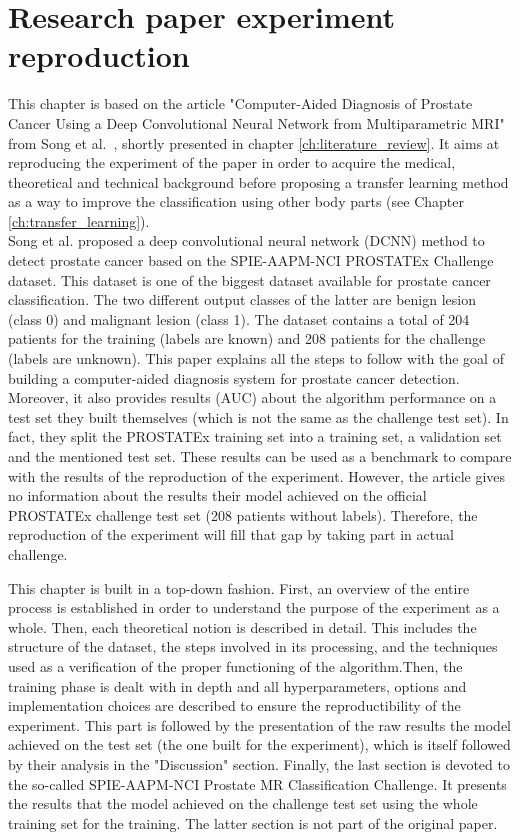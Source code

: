
\chapter{Research paper experiment reproduction}
\label{ch:paper_reproduction}
\setlength{\marginparwidth}{3cm}\leavevmode {}This chapter is based on the article "Computer-Aided Diagnosis of Prostate Cancer Using a Deep Convolutional Neural Network from Multiparametric MRI" from Song et al.~\cite{07}, shortly presented in chapter \ref{ch:literature_review}. It aims at reproducing the experiment of the paper in order to acquire the medical, theoretical and technical background before proposing a transfer learning method as a way to improve the classification using other body parts (see Chapter \ref{ch:transfer_learning}).\\
Song et al. \cite{07} proposed a deep convolutional neural network (DCNN) method to detect prostate cancer based on the SPIE-AAPM-NCI PROSTATEx Challenge dataset. This dataset is one of the biggest dataset available for prostate cancer classification. The two different output classes of the latter are benign lesion (class 0) and malignant lesion (class 1). The dataset contains a total of 204 patients for the training (labels are known) and 208 patients for the challenge (labels are unknown). This paper explains all the steps to follow with the goal of building a computer-aided diagnosis system for prostate cancer detection. Moreover, it also provides results (AUC) about the algorithm performance on a test set they built themselves (which is not the same as the challenge test set). In fact, they split the PROSTATEx training set into a training set, a validation set and the mentioned test set. These results can be used as a benchmark to compare with the results of the reproduction of the experiment. However, the article gives no information about the results their model achieved on the official PROSTATEx challenge test set (208 patients without labels). Therefore, the reproduction of the experiment will fill that gap by taking part in actual challenge.

This chapter is built in a top-down fashion. First, an overview of the entire process is established in order to understand the purpose of the experiment as a whole. Then, each theoretical notion is described in detail. This includes the structure of the dataset, the steps involved in its processing, and the techniques used as a verification of the proper functioning of the algorithm.Then, the training phase is dealt with in depth and all hyperparameters, options and implementation choices are described to ensure the reproductibility of the experiment. This part is followed by the presentation of the raw results the model achieved on the test set (the one built for the experiment), which is itself followed by their analysis in the "Discussion" section. Finally, the last section is devoted to the so-called SPIE-AAPM-NCI Prostate MR Classification Challenge. It presents the results that the model achieved on the challenge test set using the whole training set for the training. The latter section is not part of the original paper.



